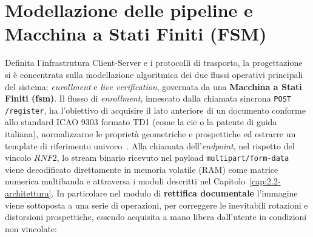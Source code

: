 
\section{Modellazione delle pipeline e Macchina a Stati Finiti (FSM)}\label{cap:2.3-pipeline}
Definita l'infrastrutura Client-Server e i protocolli di trasporto, la progettazione si è concentrata sulla modellazione algoritmica dei due flussi operativi principali del sistema: \textit{enrollment} e \textit{live verification}, governata da una \textbf{Macchina a Stati Finiti (\gls{fsm})}.
Il flusso di \textit{enrollment}, innescato dalla chiamata sincrona \texttt{POST /register}, ha l'obiettivo di acquisire il lato anteriore di un documento conforme allo standard ICAO 9303 formato TD1 (come la \gls{cie} o la patente di guida italiana), normalizzarne le proprietà geometriche e prospettiche ed estrarre un template di riferimento univoco~\cite{icao9303,kelesRepublicTurkeyIdentity2020}. 
Alla chiamata dell'\textit{endpoint}, nel rispetto del vincolo $RNF2$, lo stream binario ricevuto nel payload \texttt{multipart/form-data} viene decodificato direttamente in memoria volatile (RAM) come matrice numerica multibanda e attraversa i moduli descritti nel Capitolo~\ref{cap:2.2-architettura}. In particolare nel modulo di \textbf{rettifica documentale} l'immagine viene sottoposta a una serie di operazioni, per correggere le inevitabili rotazioni e distorsioni prospettiche, essendo acquisita a mano libera dall'utente in condizioni non vincolate:
